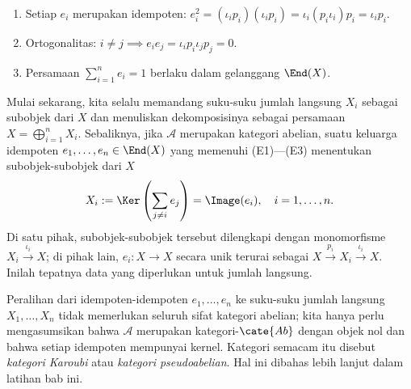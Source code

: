 \begin{enumerate}[(E1)]
	\item Setiap $e_i$ merupakan idempoten:
	$e_i^2=(\iota_i p_i)(\iota_i p_i)=\iota_i(p_i\iota_i)p_i=\iota_i p_i$.
	\item Ortogonalitas: $i\neq j \implies
	e_i e_j=\iota_i p_i\iota_j p_j=0$.
	\item Persamaan $\sum_{i=1}^n e_i=1$ berlaku dalam gelanggang $\End(X)$.
\end{enumerate}

Mulai sekarang, kita selalu memandang suku-suku jumlah langsung $X_i$ sebagai
subobjek dari $X$ dan menuliskan dekomposisinya sebagai persamaan
$X=\bigoplus_{i=1}^n X_i$. Sebaliknya, jika $\mathcal{A}$ merupakan kategori
abelian, suatu keluarga idempoten
$e_1,\ldots,e_n\in\End(X)$ yang memenuhi (E1)---(E3) menentukan subobjek-subobjek
dari $X$
\[ X_i := \Ker\left( \sum_{j \neq i} e_j \right) = \Image(e_i), \quad i=1, \ldots, n. \]
Di satu pihak, subobjek-subobjek tersebut dilengkapi dengan monomorfisme
$X_i\xrightarrow{\iota_i}X$; di pihak lain, $e_i:X\to X$ secara unik terurai
sebagai $X\xrightarrow{p_i}X_i\xrightarrow{\iota_i}X$. Inilah tepatnya data
yang diperlukan untuk jumlah langsung.

Peralihan dari idempoten-idempoten $e_1,\ldots,e_n$ ke suku-suku jumlah
langsung $X_1,\ldots,X_n$ tidak memerlukan seluruh sifat kategori abelian;
kita hanya perlu mengasumsikan bahwa $\mathcal{A}$ merupakan
kategori-$\cate{Ab}$ dengan objek nol dan bahwa setiap idempoten mempunyai
kernel. Kategori semacam itu disebut \emph{kategori Karoubi} atau
\emph{kategori pseudoabelian}. Hal ini dibahas lebih lanjut dalam latihan bab
ini.

